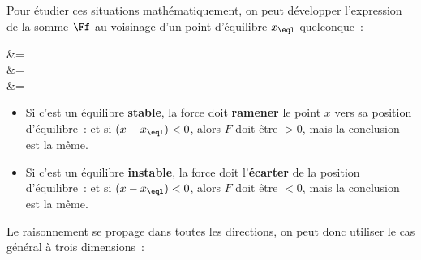 \documentclass[../../main/main.tex]{subfiles}
\begin{document}
Pour étudier ces situations mathématiquement, on peut développer l'expression de
la somme $\Ff$ au voisinage d'un point d'équilibre $x_{\eql}$ quelconque~:
\begin{DispWithArrows*}
	 &= 
	\\\Lra
	 &=
	\\\Lra
	 &= 
\end{DispWithArrows*}

\begin{itemize}
	\item Si c'est un équilibre \textbf{stable}, la force doit \textbf{ramener}
	      le point $x$ vers sa position d'équilibre~:
	      et si $(x-x_{\eql}) < 0$, alors $F$ doit être $>0$, mais la conclusion
	      est la même.
	\item Si c'est un équilibre \textbf{instable}, la force doit
	      l'\textbf{écarter} de la position d'équilibre~:
	      et si $(x-x_{\eql}) < 0$, alors $F$ doit être $<0$, mais la conclusion
	      est la même.
\end{itemize}

Le raisonnement se propage dans toutes les directions, on peut donc utiliser le
cas général à trois dimensions~:
\end{document}
